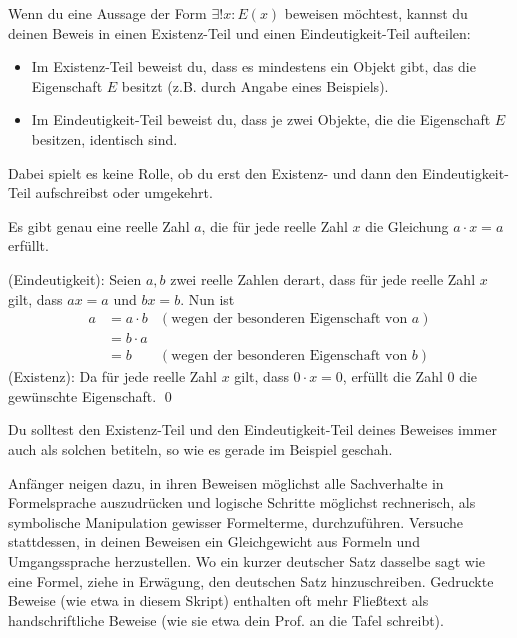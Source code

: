 \begin{satz} \label{eindbeweis} 
    Wenn du eine Aussage der Form $\exists ! x: E(x)$ beweisen möchtest, kannst du deinen Beweis in einen Existenz-Teil und einen Eindeutigkeit-Teil aufteilen:
    \begin{itemize}
        \item Im Existenz-Teil beweist du, dass es mindestens ein Objekt gibt, das die Eigenschaft $E$ besitzt (z.B. durch Angabe eines Beispiels).
        \item Im Eindeutigkeit-Teil beweist du, dass je zwei Objekte, die die Eigenschaft $E$ besitzen, identisch sind.
    \end{itemize}
    Dabei spielt es keine Rolle, ob du erst den Existenz- und dann den Eindeutigkeit-Teil aufschreibst oder umgekehrt.
\end{satz}


\begin{bsp} \label{bsp:eindbeweis}
    Es gibt genau eine reelle Zahl $a$, die für jede reelle Zahl $x$ die Gleichung $a\cdot x=a$ erfüllt.
\end{bsp}


\begin{bew}
    (Eindeutigkeit): Seien $a,b$ zwei reelle Zahlen derart, dass für jede reelle Zahl $x$ gilt, dass $ax=a$ und $bx=b$. Nun ist
    \begin{align*}
        a & = a\cdot b & (\text{wegen der besonderen Eigenschaft von $a$}) \\
        & = b \cdot a  \\
        & = b & (\text{wegen der besonderen Eigenschaft von $b$})
    \end{align*}
    (Existenz): Da für jede reelle Zahl $x$ gilt, dass $0\cdot x=0$, erfüllt die Zahl $0$ die gewünschte Eigenschaft. \qed
\end{bew}


\begin{bem}[Signalwörter]
    Du solltest den Existenz-Teil und den Eindeutigkeit-Teil deines Beweises immer auch als solchen betiteln, so wie es gerade im Beispiel geschah.
\end{bem}


\begin{bem}
    Anfänger neigen dazu, in ihren Beweisen möglichst alle Sachverhalte in Formelsprache auszudrücken und logische Schritte möglichst rechnerisch, als symbolische Manipulation gewisser Formelterme, durchzuführen. Versuche stattdessen, in deinen Beweisen ein Gleichgewicht aus Formeln und Umgangssprache herzustellen. Wo ein kurzer deutscher Satz dasselbe sagt wie eine Formel, ziehe in Erwägung, den deutschen Satz hinzuschreiben. Gedruckte Beweise (wie etwa in diesem Skript) enthalten oft mehr Fließtext als handschriftliche Beweise (wie sie etwa dein Prof. an die Tafel schreibt).
\end{bem}





